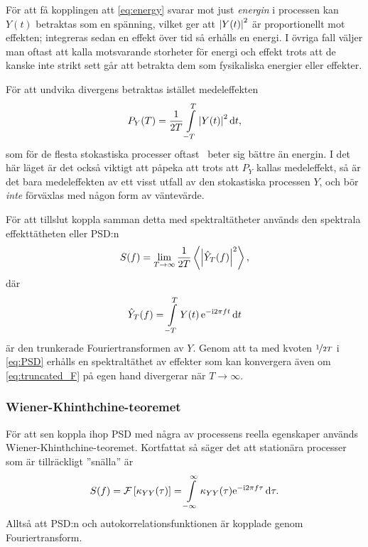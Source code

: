 För att få kopplingen att \eqref{eq:energy} svarar mot just \emph{energin} i processen kan $Y(t)$ betraktas som en spänning, vilket ger att $\abs{Y(t)}^2$ är proportionellt mot effekten; integreras sedan en effekt över tid så erhålls en energi. I övriga fall väljer man oftast att kalla motsvarande storheter för energi och effekt trots att de kanske inte strikt sett går att betrakta dem som fysikaliska energier eller effekter. 

För att undvika divergens betraktas istället medeleffekten 
\begin{equation}\label{eq:power}
P_Y(T) = \frac{1}{2T} \int_{-T}^{T} \abs{Y(t)}^2\id{t},
\end{equation}
som för de flesta stokastiska processer oftast~\cite{Miller_probability2012} beter sig bättre än energin.
I det här läget är det också viktigt att påpeka att trots att $P_Y$ kallas medeleffekt, så är det bara medeleffekten av ett visst utfall av den stokastiska processen $Y$, och bör \emph{inte} förväxlas med någon form av väntevärde. 

För att tillslut koppla samman detta med spektraltätheter används den spektrala effekttätheten eller PSD:n
\begin{equation}\label{eq:PSD}
S(f) =  \lim_{T\to\infty}\dfrac{1}{2T} \ev{\abs{\hat{Y}_T(f)}^2},
\end{equation} 
där
\begin{equation}\label{eq:truncated_F}
\hat{Y}_T(f) = \int_{-T}^{T} Y(t)\,\ee^{-\ii 2\pi f t} \id{t}
\end{equation}
är den trunkerade Fouriertransformen av $Y$. Genom att ta med kvoten $\nicefrac{1}{2T}$ i \eqref{eq:PSD} erhålls en spektraltäthet av effekter som kan konvergera även om \eqref{eq:truncated_F} på egen hand divergerar när $T\to\infty$. 

\subsubsection{Wiener-Khinthchine-teoremet}
För att sen koppla ihop PSD med några av processens reella egenskaper används Wiener-Khinthchine-teoremet. Kortfattat så säger det att stationära processer som är tillräckligt ''snälla'' är \cite{Miller_probability2012}
\begin{equation}\label{eq:W-K-theorem}
S(f) = \mathcal{F}\left[\kappa_{YY}(\tau)\right] 
= \int_{-\infty}^{\infty} 
\kappa_{YY}(\tau) \ee^{-\ii 2\pi f\tau} \id\tau.
\end{equation}
Alltså att PSD:n och autokorrelationsfunktionen är kopplade genom Fouriertransform. 

